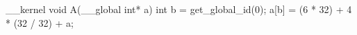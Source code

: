__kernel void A(__global int* a) {
  int b = get_global_id(0);
  a[b] = (6 * 32) + 4 * (32 / 32) + a;
}